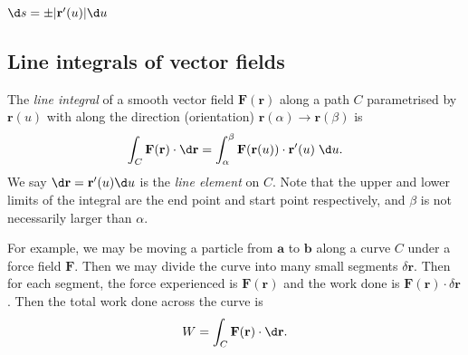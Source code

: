 \documentclass[a4paper]{article}
\begin{document}
\begin{prop}
  $\d s = \pm |\mathbf{r}'(u)| \d u$
\end{prop}
\subsection{Line integrals of vector fields}
\begin{defi}
  The \emph{line integral} of a smooth vector field $\mathbf{F}(\mathbf{r})$ along a path $C$ parametrised by $\mathbf{r}(u)$ with along the direction (orientation) $ \mathbf{r}(\alpha)\to \mathbf{r}(\beta)$ is
  \[
    \int_C \mathbf{F}(\mathbf{r})\cdot \d \mathbf{r} = \int_\alpha^\beta \mathbf{F}(\mathbf{r}(u))\cdot \mathbf{r}'(u)\; \d u.
  \]
  We say $\d \mathbf{r} = \mathbf{r}'(u) \d u$ is the \emph{line element} on $C$. Note that the upper and lower limits of the integral are the end point and start point respectively, and $\beta$ is not necessarily larger than $\alpha$.
\end{defi}
For example, we may be moving a particle from $\mathbf{a}$ to $\mathbf{b}$ along a curve $C$ under a force field $\mathbf{F}$. Then we may divide the curve into many small segments $\delta \mathbf{r}$. Then for each segment, the force experienced is $\mathbf{F}(\mathbf{r})$ and the work done is $\mathbf{F}(\mathbf{r})\cdot \delta\mathbf{r}$. Then the total work done across the curve is
\[
  W = \int_C \mathbf{F}(\mathbf{r})\cdot \d \mathbf{r}.
\]
\end{document}
